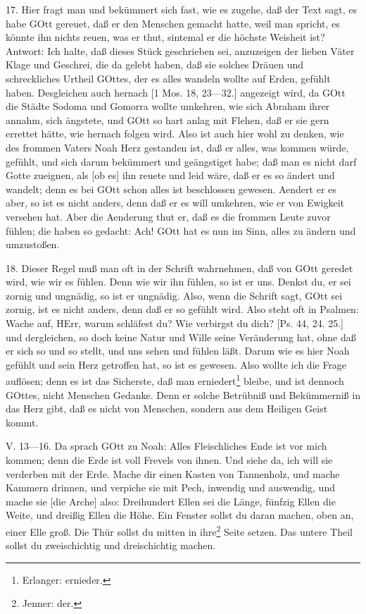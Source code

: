17. Hier fragt man und bekümmert sich fast, wie es zugehe, daß der Text sagt, es habe GOtt gereuet, daß er den Menschen gemacht hatte, weil man spricht, es könnte ihn nichts reuen, was er thut, sintemal er die höchste Weisheit ist? Antwort: Ich halte, daß dieses Stück geschrieben sei, anzuzeigen der lieben Väter Klage und Geschrei, die da gelebt haben, daß sie solches Dräuen und schreckliches Urtheil GOttes, der es alles wandeln wollte auf Erden, gefühlt haben. Desgleichen auch hernach [1 Mos. 18, 23—32.] angezeigt wird, da GOtt die Städte Sodoma und Gomorra wollte umkehren, wie sich Abraham ihrer annahm, sich ängstete, und GOtt so hart anlag mit Flehen, daß er sie gern errettet hätte, wie hernach folgen wird. Also ist auch hier wohl zu denken, wie des frommen Vaters Noah Herz gestanden ist, daß er alles, was kommen würde, gefühlt, und sich darum bekümmert und geängstiget habe; daß man es nicht darf Gotte zueignen, als [ob es] ihn reuete und leid wäre, daß er es so ändert und wandelt; denn es bei GOtt schon alles ist beschlossen gewesen. Aendert er es aber, so ist es nicht anders, denn daß er es will umkehren, wie er von Ewigkeit versehen hat. Aber die Aenderung thut er, daß es die frommen Leute zuvor fühlen; die haben so gedacht: Ach! GOtt hat es nun im Sinn, alles zu ändern und umzustoßen.

18. Dieser Regel muß man oft in der Schrift wahrnehmen, daß von GOtt geredet wird, wie wir es fühlen. Denn wie wir ihn fühlen, so ist er uns. Denkst du, er sei zornig und ungnädig, so ist er ungnädig. Also, wenn die Schrift sagt, GOtt sei zornig, ist es nicht anders, denn daß er so gefühlt wird. Also steht oft in Psalmen: Wache auf, HErr, warum schläfest du? Wie verbirgst du dich? [Ps. 44, 24. 25.] und dergleichen, so doch keine Natur und Wille seine Veränderung hat, ohne daß er sich so und so stellt, und uns sehen und fühlen läßt. Darum wie es hier Noah gefühlt und sein Herz getroffen hat, so ist es gewesen. Also wollte ich die Frage auflösen; denn es ist das Sicherste, daß man erniedert\footnote{Erlanger: ernieder.} bleibe, und ist dennoch GOttes, nicht Menschen Gedanke. Denn er solche Betrübniß und Bekümmerniß in das Herz gibt, daß es nicht von Menschen, sondern aus dem Heiligen Geist kommt.

\begin{schriftzitat}
V. 13—16. Da sprach GOtt zu Noah: Alles Fleischliches Ende ist vor mich kommen; denn die Erde ist voll Frevels von ihnen. Und siehe da, ich will sie verderben mit der Erde. Mache dir einen Kasten von Tannenholz, und mache Kammern drinnen, und verpiche sie mit Pech, inwendig und auswendig, und mache sie [die Arche] also: Dreihundert Ellen sei die Länge, fünfzig Ellen die Weite, und dreißig Ellen die Höhe. Ein Fenster sollst du daran machen, oben an, einer
Elle groß. Die Thür sollst du mitten in ihre\footnote{Jenner: der.} Seite setzen. Das untere Theil sollst du zweischichtig und dreischichtig machen.
\end{schriftzitat}

